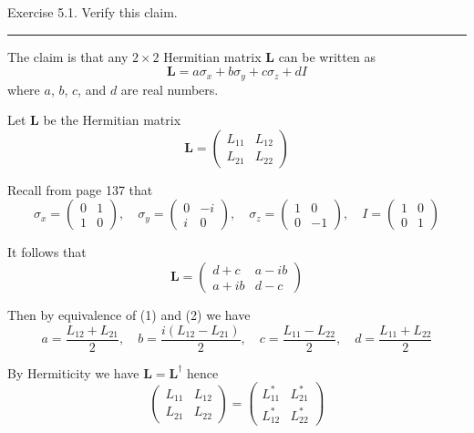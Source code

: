 \documentclass[12pt]{article}
\begin{document}
Exercise 5.1.
Verify this claim.

\bigskip
\hrule

\bigskip
The claim is that any $2\times2$ Hermitian matrix $\mathbf L$ can be written as
\begin{equation*}
\mathbf L=a\sigma_x+b\sigma_y+c\sigma_z+dI
\end{equation*}
where $a$, $b$, $c$, and $d$ are real numbers.

\bigskip
Let $\mathbf L$ be the Hermitian matrix
\begin{equation*}
\mathbf L=\begin{pmatrix}L_{11}&L_{12}\\L_{21}&L_{22}\end{pmatrix}
\tag{1}
\end{equation*}

Recall from page 137 that
\begin{equation*}
\sigma_x=\begin{pmatrix}0&1\\1&0\end{pmatrix},
\quad
\sigma_y=\begin{pmatrix}0&-i\\i&0\end{pmatrix},
\quad
\sigma_z=\begin{pmatrix}1&0\\0&-1\end{pmatrix},
\quad
I=\begin{pmatrix}1&0\\0&1\end{pmatrix}
\end{equation*}

It follows that
\begin{equation*}
\mathbf L=\begin{pmatrix}d+c&a-ib\\a+ib&d-c\end{pmatrix}
\tag{2}
\end{equation*}

Then by equivalence of (1) and (2) we have
\begin{equation*}
a=\frac{L_{12}+L_{21}}{2},
\quad
b=\frac{i(L_{12}-L_{21})}{2},
\quad
c=\frac{L_{11}-L_{22}}{2},
\quad
d=\frac{L_{11}+L_{22}}{2}
\end{equation*}

By Hermiticity we have $\mathbf L=\mathbf L^\dag$ hence
\begin{equation*}
\begin{pmatrix}L_{11}&L_{12}\\L_{21}&L_{22}\end{pmatrix}
=\begin{pmatrix}L_{11}^*&L_{21}^*\\L_{12}^*&L_{22}^*\end{pmatrix}
\end{equation*}
\end{document}
